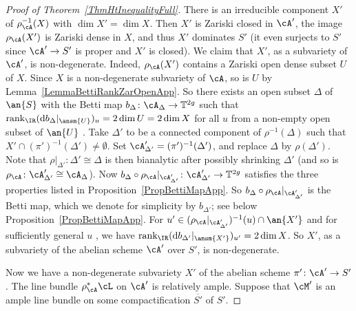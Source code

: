 \begin{proof}[Proof of Theorem~\ref{ThmHtInequalityFull}]
There is  an irreducible component $X'$ of $\rho_{\cA}^{-1}(X)$ with
$\dim X' = \dim X$. Then $X'$ is Zariski closed in $\cA'$,
the image $\rho_{\cA}(X')$ is Zariski dense in $X$,  and thus $X'$ dominates $S'$ (it even surjects to $S'$
since $\cA'\rightarrow S'$ is proper and $X'$ is closed). We
claim that $X'$, as a subvariety of $\cA'$, is non-degenerate.
Indeed, $\rho_{\cA}(X')$ contains a Zariski open dense subset $U$ of
$X$. Since $X$ is a non-degenerate
subvariety of $\cA$, so is $U$ by
Lemma~\ref{LemmaBettiRankZarOpenApp}. So there exists an open subset
$\Delta$ of $\an{S}$ with the Betti map $b_{\Delta} \colon
\cA_{\Delta} \rightarrow \mathbb{T}^{2g}$ such that
$\mathrm{rank}_{\IR}(\mathrm{d}b_{\Delta}|_{\ansm{U}})_u = 2 \dim U =
2 \dim X$ %
for all $u$ from a non-empty open subset of $\an{U}$
. Take $\Delta'$ to be a connected component of $\rho^{-1}(\Delta)$ such that $X'
\cap (\pi')^{-1}(\Delta') \not= \emptyset$. Set $\cA'_{\Delta'} =
(\pi')^{-1}(\Delta')$, and replace $\Delta$ by $\rho(\Delta')$.
Note that $\rho|_{\Delta'}\colon \Delta' \cong \Delta$ is then
bianalytic after possibly shrinking $\Delta'$ (and so is $\rho_{\cA}\colon \cA'_{\Delta'} \cong
\cA_{\Delta}$). Now $b_{\Delta} \circ \rho_{\cA}|_{\cA'_{\Delta'}} \colon \cA'_{\Delta'} \rightarrow \mathbb{T}^{2g}$ satisfies the three properties listed in Proposition~\ref{PropBettiMapApp}. So $b_{\Delta} \circ \rho_{\cA}|_{\cA'_{\Delta'}}$ is the Betti map, which we denote for simplicity by $b_{\Delta'}$; see below Proposition~\ref{PropBettiMapApp}.
For $u' \in  (\rho_{\cA}|_{\cA'_{\Delta'}})^{-1}(u)\cap \an{X'}$
 and for sufficiently general $u$%
, we have
$\mathrm{rank}_{\IR}(\mathrm{d}b_{\Delta'}|_{\ansm{X'}})_{u'} = 2 \dim X$. So $X'$, as a subvariety of the abelian scheme $\cA'$ over $S'$, is non-degenerate.

Now we have a non-degenerate subvariety $X'$ of the abelian scheme $\pi' \colon \cA' \rightarrow S'$. The line bundle $\rho_{\cA}^*\cL$ on $\cA'$ is relatively ample. Suppose that $\cM'$ is an ample line bundle on some compactification $\overline{S'}$ of $S'$.


\end{proof}
